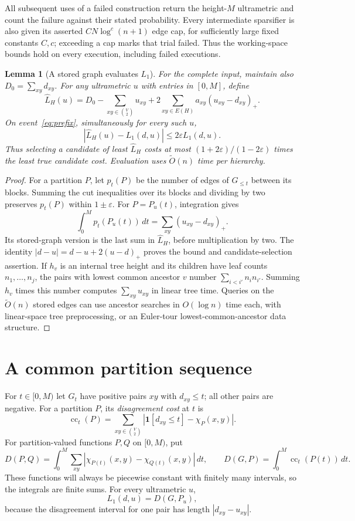 \documentclass[11pt]{article}
\newtheorem{lemma}[theorem]{Lemma}
\theoremstyle{definition}
\newcommand{\ind}{\mathbf 1}
\newcommand{\wt}{\widetilde}
\newcommand{\join}{\chi}
\begin{document}
All subsequent uses of a failed construction return the height-$M$
ultrametric and count the failure against their stated probability. Every intermediate sparsifier is also given its asserted $C N\log^c(n+1)$ edge cap, for sufficiently large fixed constants $C,c$; exceeding a cap marks that trial failed. Thus the working-space bounds hold on every execution, including failed executions.

\begin{lemma}[A stored graph evaluates $L_1$]\label{lem:cost-sketch}
For the complete input, maintain also $D_0=\sum_{xy}d_{xy}$.
For any ultrametric $u$ with entries in $[0,M]$, define
\[
 \widehat L_H(u)=D_0-\sum_{xy\in\binom V2}u_{xy}
       +2\sum_{xy\in E(H)}a_{xy}(u_{xy}-d_{xy})_+.
\]
On event~\eqref{eq:prefix}, simultaneously for every such $u$,
\[
 |\widehat L_H(u)-L_1(d,u)|\le2\varepsilon L_1(d,u).
\]
Thus selecting a candidate of least $\widehat L_H$ costs at most
$(1+2\varepsilon)/(1-2\varepsilon)$ times the least true candidate cost.
Evaluation uses $\wt O(n)$ time per hierarchy.
\end{lemma}
\begin{proof}
For a partition $P$, let $p_t(P)$ be the number of edges of $G_{\le t}$
between its blocks. Summing the cut inequalities over its blocks and
dividing by two preserves $p_t(P)$ within $1\pm\varepsilon$.
For $P=P_u(t)$, integration gives
\[
 \int_0^M p_t(P_u(t))\,dt=\sum_{xy}(u_{xy}-d_{xy})_+.
\]
Its stored-graph version is the last sum in $\widehat L_H$, before
multiplication by two. The identity
$|d-u|=d-u+2(u-d)_+$ proves the bound and candidate-selection assertion.
If $h_v$ is an internal tree height and its children have leaf counts
$n_1,\ldots,n_j$, the pairs with lowest common ancestor $v$ number
$\sum_{i<i'}n_in_{i'}$. Summing $h_v$ times this number computes
$\sum_{xy}u_{xy}$ in linear tree time. Queries on the $\wt O(n)$ stored
edges can use ancestor searches in $O(\log n)$ time each, with linear-space
tree preprocessing, or an Euler-tour lowest-common-ancestor data structure.
\end{proof}

\section{A common partition sequence}
\label{sec:guide}

For $t\in[0,M)$ let $G_t$ have positive pairs $xy$ with $d_{xy}\le t$;
all other pairs are negative. For a partition $P$, its
\emph{disagreement cost} at $t$ is
\[
 \operatorname{cc}_t(P)=
 \sum_{xy\in\binom V2}
 |\ind[d_{xy}\le t]-\join_P(x,y)|.
\]
For partition-valued functions $P,Q$ on $[0,M)$, put
\[
 D(P,Q)=\int_0^M\sum_{xy}|\join_{P(t)}(x,y)-\join_{Q(t)}(x,y)|\,dt,
 \qquad
 D(G,P)=\int_0^M\operatorname{cc}_t(P(t))\,dt.
\]
These functions will always be piecewise constant with finitely many
intervals, so the integrals are finite sums. For every ultrametric $u$,
\begin{equation}\label{eq:cake}
 L_1(d,u)=D(G,P_u),
\end{equation}
because the disagreement interval for one pair has length $|d_{xy}-u_{xy}|$.
\end{document}
